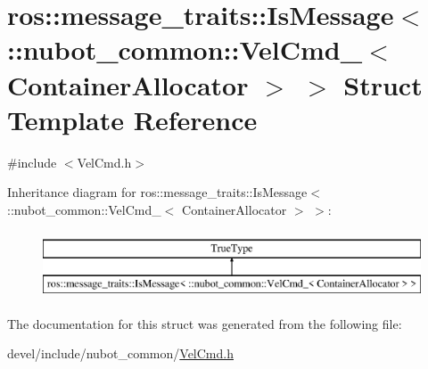 \hypertarget{structros_1_1message__traits_1_1IsMessage_3_01_1_1nubot__common_1_1VelCmd___3_01ContainerAllocator_01_4_01_4}{\section{ros\-:\-:message\-\_\-traits\-:\-:Is\-Message$<$ \-:\-:nubot\-\_\-common\-:\-:Vel\-Cmd\-\_\-$<$ Container\-Allocator $>$ $>$ Struct Template Reference}
\label{structros_1_1message__traits_1_1IsMessage_3_01_1_1nubot__common_1_1VelCmd___3_01ContainerAllocator_01_4_01_4}
}


{\ttfamily \#include $<$Vel\-Cmd.\-h$>$}

Inheritance diagram for ros\-:\-:message\-\_\-traits\-:\-:Is\-Message$<$ \-:\-:nubot\-\_\-common\-:\-:Vel\-Cmd\-\_\-$<$ Container\-Allocator $>$ $>$\-:\begin{figure}[H]
\begin{center}
\leavevmode
\includegraphics[height=2.000000cm]{structros_1_1message__traits_1_1IsMessage_3_01_1_1nubot__common_1_1VelCmd___3_01ContainerAllocator_01_4_01_4}
\end{center}
\end{figure}


The documentation for this struct was generated from the following file\-:\begin{DoxyCompactItemize}
\item 
devel/include/nubot\-\_\-common/\hyperlink{VelCmd_8h}{Vel\-Cmd.\-h}\end{DoxyCompactItemize}
